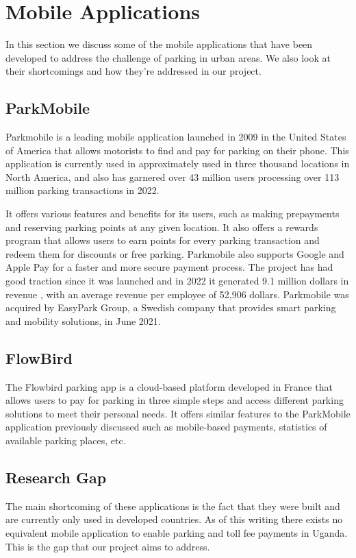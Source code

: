 \clearpage


\section{Mobile Applications}
In this section we discuss some of the mobile applications that have been developed to address the challenge of parking in urban areas. We also look at their shortcomings and how they're addressed in our project.

\subsection{ParkMobile}
Parkmobile is a leading mobile application launched in 2009 in the United States of America that allows motorists to find and pay for parking on their phone. This application is currently used in approximately used in three thousand locations in North America, and also has garnered over 43 million users processing over 113 million parking transactions in 2022.

It offers various features and benefits for its users, such as making prepayments and reserving parking points at any given location. It also offers a rewards program that allows users to earn points for every parking transaction and redeem them for discounts or free parking. Parkmobile also supports Google and Apple Pay for a faster and more secure payment process. \cite{ParkMobile2023}
The project has had good traction since it was launched and in 2022 it generated 9.1 million dollars in revenue , with an average revenue per employee of 52,906 dollars. Parkmobile was acquired by EasyPark Group, a Swedish company that provides smart parking and mobility solutions, in June 2021.

\subsection{FlowBird}
The Flowbird parking app is a cloud-based platform developed in France that allows users to pay for parking in three simple steps and access different parking solutions to meet their personal needs. It offers similar features to the ParkMobile application previously discussed such as mobile-based payments, statistics of available parking places, etc\cite{Flowbird2023}.

\subsection{Research Gap}
The main shortcoming of these applications is the fact that they were built and are currently only used in developed countries. As of this writing there exists no equivalent mobile application to enable parking and toll fee payments in Uganda. This is the gap that our project aims to address.


